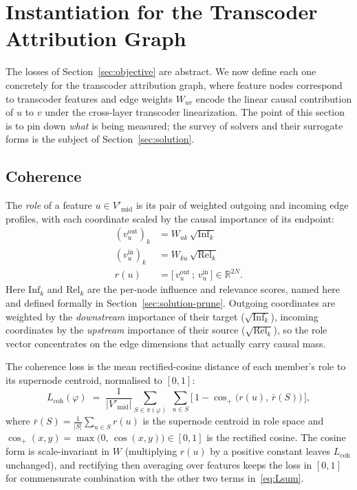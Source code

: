 \section{Instantiation for the Transcoder Attribution Graph}\label{sec:attr-instance}

The losses of Section~\ref{sec:objective} are abstract. We now define each
one concretely for the transcoder attribution graph, where feature nodes
correspond to transcoder features and edge weights $W_{uv}$ encode the
linear causal contribution of $u$ to $v$ under the cross-layer
transcoder linearization. The point of this section is to pin down
\emph{what} is being measured; the survey of solvers and their surrogate
forms is the subject of Section~\ref{sec:solution}.

\subsection{Coherence}\label{sec:attr-coh}

The \emph{role} of a feature $u \in V'_{\text{mid}}$ is its pair of
weighted outgoing and incoming edge profiles, with each coordinate
scaled by the causal importance of its endpoint:
\begin{align}
(v_u^{\text{out}})_k &= W_{uk}\,\sqrt{\mathrm{Inf}_k} \nonumber \\
(v_u^{\text{in}})_k  &= W_{ku}\,\sqrt{\mathrm{Rel}_k} \nonumber \\
r(u) &= \bigl[\,v_u^{\text{out}}\,;\, v_u^{\text{in}}\,\bigr] \in \mathbb{R}^{2N}.
\label{eq:role}
\end{align}
Here $\mathrm{Inf}_k$ and $\mathrm{Rel}_k$ are the per-node influence
and relevance scores, named here and defined formally in
Section~\ref{sec:solution-prune}. Outgoing coordinates are weighted by
the \emph{downstream} importance of their target
($\sqrt{\mathrm{Inf}_k}$), incoming coordinates by the \emph{upstream}
importance of their source ($\sqrt{\mathrm{Rel}_k}$), so the role vector
concentrates on the edge dimensions that actually carry causal mass.

The coherence loss is the mean rectified-cosine distance of each
member's role to its supernode centroid, normalised to $[0, 1]$:
\begin{equation}
L_{\text{coh}}(\varphi)
\;=\;
\frac{1}{|V'_{\text{mid}}|}
\sum_{S \in \pi(\varphi)}\; \sum_{u \in S}
\bigl[\,1 - \cos_{+}\!\bigl(r(u),\, \bar r(S)\bigr)\,\bigr],
\label{eq:Lcoh}
\end{equation}
where $\bar r(S) = \frac{1}{|S|}\sum_{u \in S} r(u)$ is the supernode
centroid in role space and $\cos_{+}(x, y) = \max\!\bigl(0,\, \cos(x,
y)\bigr) \in [0, 1]$ is the rectified cosine. The cosine form is
scale-invariant in $W$ (multiplying $r(u)$ by a positive constant
leaves $L_{\text{coh}}$ unchanged), and rectifying then averaging over
features keeps the loss in $[0, 1]$ for commensurate combination with
the other two terms in~\eqref{eq:Lsum}.

